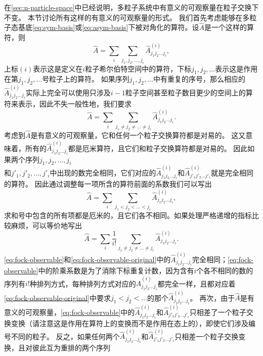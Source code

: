 \documentclass[UTF8, a4paper]{ctexart}
\begin{document}
在\autoref{sec:n-particle-space}中已经说明，多粒子系统中有意义的可观察量在粒子交换下不变。
本节讨论所有这样的有意义的可观察量的形式。
我们首先考虑能够在多粒子态基底\eqref{eq:sym-basis}或\eqref{eq:asym-basis}下被对角化的算符。设$\hat{A}$是一个这样的算符，则
\[
    \hat{A} = \sum_i \sum_{j_1, j_2, \ldots, j_i} \hat{A}^{(i)}_{j_1 j_2 \ldots j_i},
\]
上标$(i)$表示这是定义在$i$粒子希尔伯特空间中的算符，下标$j_1, j_2, \ldots$表示这是作用在第$j_1, j_2, \ldots$号粒子上的算符。
如果序列$j_1, j_2, \ldots$中有重复的序号，那么相应的$\hat{A}^{(i)}_{j_1 j_2 \ldots j_i}$实际上完全可以使用只涉及$i-1$粒子空间甚至粒子数目更少的空间上的算符来表示，因此不失一般性地，我们要求
\[
    \hat{A} = \sum_i \sum_{j_1 \neq j_2 \neq \ldots \neq j_i} \hat{A}^{(i)}_{j_1 j_2 \ldots j_i}.
\]
考虑到$\hat{A}$是有意义的可观察量，它和任何一个粒子交换算符都是对易的。
这又意味着，所有的$\hat{A}^{(i)}_{j_1 j_2 \ldots j_i}$都是厄米算符，且它们和粒子交换算符都是对易的。
因此如果两个序列$j_1, j_2, \ldots, j_i$ \\
和$j'_1, j'_2, \ldots, j'_i$中出现的数完全相同，它们对应的$\hat{A}^{(i)}_{j_1 j_2 \ldots j_i}$和$\hat{A}^{(i)}_{j'_1 j'_2 \ldots j'_i}$就是完全相同的算符。
因此通过调整每一项所含的算符前面的系数我们可以写出
\begin{equation}
    \hat{A} = \sum_i \sum_{j_1 < j_2 < \ldots < j_i} \hat{A}^{(i)}_{j_1 j_2 \ldots j_i},
    \label{eq:fock-observable-original}
\end{equation}
求和号中包含的所有项都是厄米的，且它们各不相同。如果处理严格递增的指标比较麻烦，可以等价地写出
\begin{equation}
    \hat{A} = \sum_i \frac{1}{i!} \sum_{j_1 \neq j_2 \neq \ldots \neq j_i} \hat{A}^{(i)}_{j_1 j_2 \ldots j_i}.
    \label{eq:fock-observable}
\end{equation}
\eqref{eq:fock-observable}和\eqref{eq:fock-observable-original}中的$\hat{A}^{(i)}_{j_1 j_2 \ldots j_i}$完全相同；\eqref{eq:fock-observable}中的阶乘系数是为了消除下标重复计数，因为含有$i$个各不相同的数的序列有$i!$种排列方式，每种排列方式对应的$\hat{A}^{(i)}_{j_1 j_2 \ldots j_i}$都完全一样，且都对应着\eqref{eq:fock-observable-original}中要求$j_1 < j_2 < \ldots$的那个$\hat{A}^{(i)}_{j_1 j_2 \ldots j_i}$。
再次，由于$\hat{A}$是有意义的可观察量，\eqref{eq:fock-observable}中的$\hat{A}^{(i)}_{j_1 j_2 \ldots j_i}$和$\hat{A}^{(i)}_{j'_1 j'_2 \ldots j'_i}$只相差了一个粒子交换变换（请注意这是作用在算符上的变换而不是作用在态上的），即使它们涉及编号不同的粒子。
反之，如果任何两个$\hat{A}^{(i)}_{j_1 j_2 \ldots j_i}$和$\hat{A}^{(i)}_{j'_1 j'_2 \ldots j'_i}$只相差一个粒子交换变换，且对彼此互为重排的两个序列
\end{document}
